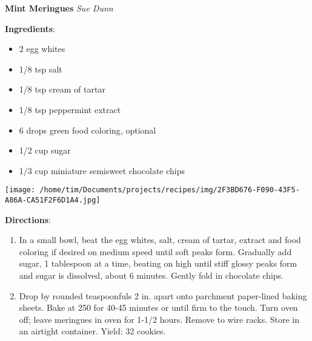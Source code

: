 \documentclass[11pt, twoside, openany]{book}
\begin{document}
\noindent\begin{minipage}[t]{\linewidth}%
{\Large\textbf{Mint Meringues}} \label{mint-meringues}\hfill\textit{Sue Dunn}\\
\noindent\begin{minipage}[t]{0.78\linewidth}%
\textbf{Ingredients}:\vspace{-3mm}
\begin{multicols}{2}
\begin{itemize}\setlength\itemsep{-1mm}
\item 2 egg whites
\item 1/8 tsp salt
\item 1/8 tsp cream of tartar
\item 1/8 tsp peppermint extract
\item 6 drops green food coloring, optional
\item 1/2 cup sugar
\item 1/3 cup miniature semisweet chocolate chips
\end{itemize}
\end{multicols}
\end{minipage}
\noindent\begin{minipage}[t]{0.18\linewidth}
\centering \strut\vspace*{-\baselineskip}\newline
\texttt{[image: /home/tim/Documents/projects/recipes/img/2F3BD676-F090-43F5-A86A-CA51F2F6D1A4.jpg]}\\
\end{minipage}\vspace{3mm}
\textbf{Directions}:
\vspace{-3mm}\begin{enumerate}\setlength\itemsep{-1mm}
\item In a small bowl, beat the egg whites, salt, cream of tartar, extract and food coloring if desired on medium speed until soft peaks form. Gradually add sugar, 1 tablespoon at a time, beating on high until stiff glossy peaks form and sugar is dissolved, about 6 minutes. Gently fold in chocolate chips.
\item Drop by rounded teaspoonfuls 2 in. apart onto parchment paper-lined baking sheets. Bake at 250 for 40-45 minutes or until firm to the touch. Turn oven off; leave meringues in oven for 1-1/2 hours. Remove to wire racks. Store in an airtight container. Yield: 32 cookies.
\end{enumerate}
\end{minipage}\vspace{8mm}
\end{document}
